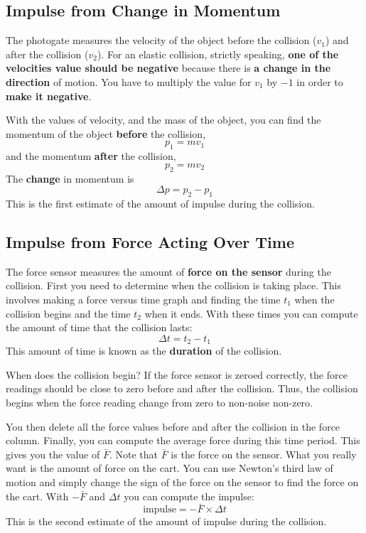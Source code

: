\subsection{Impulse from Change in Momentum}
%
The photogate measures the velocity of the object before the collision ($v_{1}$) and after the collision ($v_{2}$). For an elastic collision, strictly speaking, \textbf{one of the velocities value should be negative} because there is \textbf{a change in the direction} of motion. You have to multiply the value for $v_{1}$ by $-1$ in order to \textbf{make it negative}.

With the values of velocity, and the mass of the object, you can find the momentum of the object \textbf{before} the collision,
\begin{equation}
    p_{1} = m v_{1}
\end{equation}
and the momentum \textbf{after} the collision,
\begin{equation}
    p_{2} = m v_{2}
\end{equation}
The \textbf{change} in momentum is
\begin{equation}
    \Delta p = p_{2} - p_{1}
\end{equation}
This is the first estimate of the amount of impulse during the collision.
%
\subsection{Impulse from Force Acting Over Time}
%
The force sensor measures the amount of \textbf{force on the sensor} during the collision. First you need to determine when the collision is taking place. This involves making a force versus time graph and finding the time $t_{1}$ when the collision begins and the time $t_{2}$ when it ends. With these times you can compute the amount of time that the collision lasts:
\begin{equation}
    \Delta t = t_{2} - t_{1}
\end{equation}
This amount of time is known as the \textbf{duration} of the collision.

When does the collision begin? If the force sensor is zeroed correctly, the force readings should be close to zero before and after the collision. Thus, the collision begins when the force reading change from zero to non-noise non-zero.

You then delete all the force values before and after the collision in the force column. Finally, you can compute the average force during this time period. This gives you the value of $\bar{F}$. Note that $\bar{F}$ is the force on the sensor. What you really want is the amount of force on the cart. You can use Newton's third law of motion and simply change the sign of the force on the sensor to find the force on the cart. With $-\bar{F}$ and $\Delta t$ you can compute the impulse:
\begin{equation}
    \text{impulse} = -\bar{F} \times \Delta t
\end{equation}
This is the second estimate of the amount of impulse during the collision.
%
